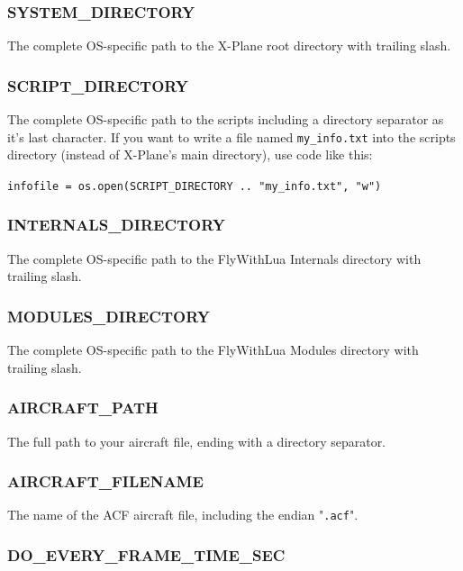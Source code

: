 \documentclass[11pt,parskip=half,a4paper]{scrartcl}
\begin{document}
\subsubsection{SYSTEM\_DIRECTORY}

The complete OS-specific path to the X-Plane root directory with trailing slash.

\subsubsection{SCRIPT\_DIRECTORY}

The complete OS-specific path to the scripts including a directory separator as it's last character. If you want to write a file named \verb|my_info.txt| into the scripts directory (instead of X-Plane's main directory), use code like this:

\verb|infofile = os.open(SCRIPT_DIRECTORY .. "my_info.txt", "w")|

\subsubsection{INTERNALS\_DIRECTORY}

The complete OS-specific path to the FlyWithLua Internals directory with trailing slash.

\subsubsection{MODULES\_DIRECTORY}

The complete OS-specific path to the FlyWithLua Modules directory with trailing slash.

\subsubsection{AIRCRAFT\_PATH}

The full path to your aircraft file, ending with a directory separator.

\subsubsection{AIRCRAFT\_FILENAME}

The name of the ACF aircraft file, including the endian "\verb|.acf|".

\subsubsection{DO\_EVERY\_FRAME\_TIME\_SEC}
\end{document}
